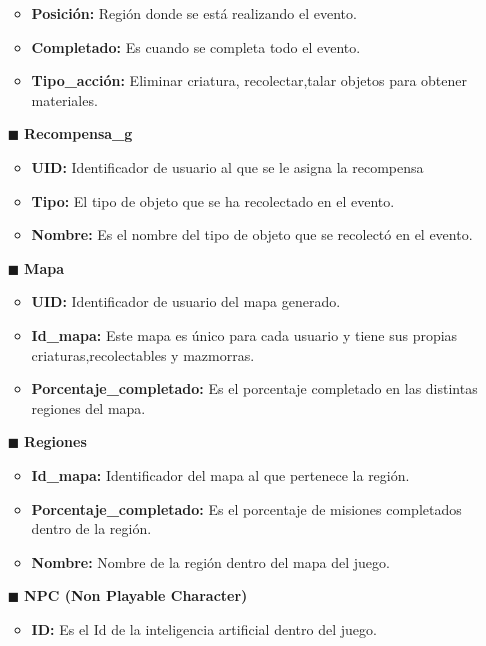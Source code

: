 \documentclass{report}
\begin{document}
\begin{itemize}
\begin{itemize}
            \item \textbf{Posición:} Región donde se está realizando el evento.
            \item \textbf{Completado:} Es cuando se completa todo el evento.
            \item \textbf{Tipo\_acción:} Eliminar criatura, recolectar,talar objetos para obtener materiales.  
        \end{itemize}
    \item[$\blacksquare$]\textbf{Recompensa\_g}
        \begin{itemize}
            \item \textbf{UID:} Identificador de usuario al que se le asigna la recompensa
            \item \textbf{Tipo:} El tipo de objeto que se ha recolectado en el evento.
            \item \textbf{Nombre:} Es el nombre del tipo de objeto que se recolectó en el evento.
        \end{itemize}
    \item[$\blacksquare$]\textbf{Mapa}
        \begin{itemize}
            \item \textbf{UID:} Identificador de usuario del mapa generado.
            \item \textbf{Id\_mapa:} Este mapa es único para cada usuario y tiene sus propias criaturas,recolectables y mazmorras.
            \item \textbf{Porcentaje\_completado:} Es el porcentaje completado en las distintas regiones del mapa.
        \end{itemize}
    \item[$\blacksquare$]\textbf{Regiones}
        \begin{itemize}
            \item \textbf{Id\_mapa:} Identificador del mapa al que pertenece la región.
            \item \textbf{Porcentaje\_completado:} Es el porcentaje de misiones completados dentro de la región.
            \item \textbf{Nombre:} Nombre de la región dentro del mapa del juego.
        \end{itemize}
    \item[$\blacksquare$]\textbf{NPC (Non Playable Character)}
        \begin{itemize}
            \item \textbf{ID:} Es el Id de la inteligencia artificial dentro del juego.

\end{itemize}
\end{itemize}
\end{document}
